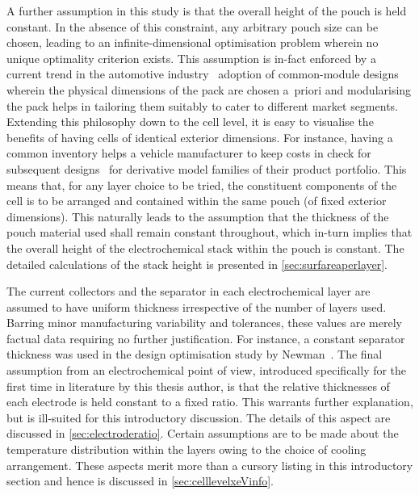 A further assumption  in this study is  that the overall height of  the pouch is
held constant. In  the absence of this constraint, any  arbitrary pouch size can
be chosen,  leading to an  infinite-dimensional optimisation problem  wherein no
unique optimality  criterion exists.  This assumption is  in-fact enforced  by a
current  trend  in the  automotive  industry  \viz~adoption  of  common-module
designs wherein  the physical  dimensions of  the pack  are chosen  a~priori and
modularising the  pack helps in  tailoring them  suitably to cater  to different
market segments. Extending this philosophy down to the cell level, it is easy to
visualise the  benefits of  having cells of  identical exterior  dimensions. For
instance, having a  common inventory helps a vehicle manufacturer  to keep costs
in check  for subsequent designs  \eg~for  derivative model families  of their
product  portfolio. This  means that,  for  any layer  choice to  be tried,  the
constituent components  of the cell is  to be arranged and  contained within the
same  pouch  (of  fixed  exterior  dimensions).  This  naturally  leads  to  the
assumption that the  thickness of the pouch material used  shall remain constant
throughout, which in-turn implies that the overall height of the electrochemical
stack  within the  pouch is  constant. The  detailed calculations  of the  stack
height is presented in \cref{sec:surfareaperlayer}.

The  current collectors  and the  separator  in each  electrochemical layer  are
assumed  to  have  uniform  thickness  irrespective  of  the  number  of  layers
used.  Barring  minor manufacturing  variability  and  tolerances, these  values
are  merely  factual data  requiring  no  further justification.  For  instance,
a  constant  separator thickness  was  used  in  the design  optimisation  study
by  Newman~\cite{Newman1995}.  The  final  assumption  from  an  electrochemical
point  of view,  introduced specifically  for the  first time  in literature  by
this  thesis author,  is  that the  relative thicknesses  of  each electrode  is
held  constant to  a  fixed ratio.  This warrants  further  explanation, but  is
ill-suited  for this  introductory discussion.  The details  of this  aspect are
discussed  in  \cref{sec:electroderatio}. Certain  assumptions  are  to be  made
about the  temperature distribution  within the  layers owing  to the  choice of
cooling arrangement.  These aspects merit  more than  a cursory listing  in this
introductory section and hence is discussed in \cref{sec:celllevelxeVinfo}.

